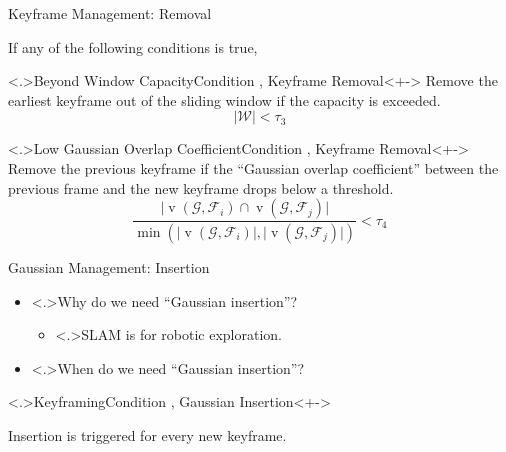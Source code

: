 \begin{Frame}{Keyframe Management: Removal}
	\par If any of the following conditions is true,
	\vspace*{\fill}
	\begin{block}{\alert<.>{Beyond Window Capacity}\hfill Condition , Keyframe Removal}<+->
		Remove the earliest keyframe out of the sliding window if the capacity is exceeded.
		\begin{equation}
			\vert \mathcal{W} \vert < \tau_3
		\end{equation}
	\end{block}
	\vspace*{\fill}
	\begin{block}{\alert<.>{Low Gaussian Overlap Coefficient}\hfill Condition , Keyframe Removal}<+->
		Remove the previous keyframe if the ``Gaussian overlap coefficient'' between the previous frame and the new keyframe drops below a threshold.
		\begin{equation}
			\frac{\vert \operatorname{v}\left(\mathcal{G}, \mathcal{F}_{i}\right) \cap \operatorname{v}\left(\mathcal{G}, \mathcal{F}_{j}\right) \vert}{\min \left(\vert\operatorname{v}\left(\mathcal{G}, \mathcal{F}_{i}\right) \vert, \vert\operatorname{v}\left(\mathcal{G}, \mathcal{F}_{j}\right) \vert\right)} < \tau_4
		\end{equation}
	\end{block}
\end{Frame}

\begin{Frame}{Gaussian Management: Insertion}
	\begin{itemize}
		\setlength{\itemsep}{1.5ex}
		\item<+-> \alert<.>{Why} do we need ``Gaussian insertion''?
			\vspace*{1.5ex}
			\begin{itemize}
				\setlength{\itemsep}{1.5ex}
				\item<+-> \alert<.>{SLAM} is for robotic exploration.
			\end{itemize}
	\end{itemize}
	\vspace*{\fill}
	\begin{itemize}
		\setlength{\itemsep}{1.5ex}
		\item<+-> \alert<.>{When} do we need ``Gaussian insertion''?
	\end{itemize}
	\begin{block}{\alert<.>{Keyframing}\hfill Condition , Gaussian Insertion}<+->
		\par Insertion is triggered for every new keyframe.
	\end{block}
\end{Frame}

